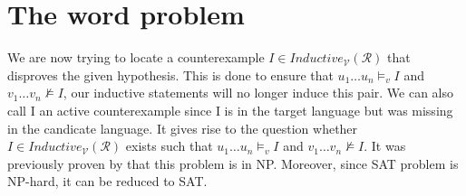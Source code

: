 \section{The word problem}
We are now trying to locate a counterexample $I \in Inductive_{\mathcal{V}}(\mathcal{R})$ that disproves the given hypothesis. 
This is done to ensure that $u_1 \dots u_n \models_v I$
and $v_1 \dots v_n \not\models I$, our inductive statements will no longer induce this pair.
We can also call I an active counterexample since I is in the target language but was missing in 
the candicate language. 
It gives rise to the question whether $I \in Inductive_{\mathcal{V}}(\mathcal{R})$ exists such that $u_1 \dots u_n \models_v I$
and $v_1 \dots v_n \not\models I$.
It was previously proven by \cite{latex} that this problem is in NP.
Moreover, since SAT problem is NP-hard, it can be reduced to SAT.

